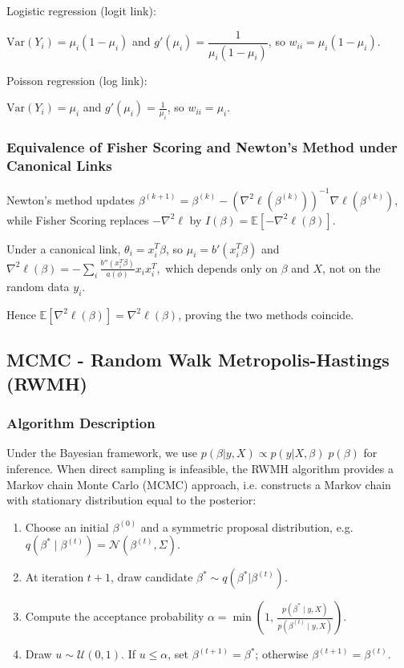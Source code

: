\documentclass[11pt]{article}
\newcommand{\derivstep}[1]{%
  \par\medskip\noindent #1%
}
\begin{document}
\derivstep{Logistic regression (logit link): }
$\mathrm{Var}(Y_i)=\mu_i(1-\mu_i)$ and
$g'(\mu_i)=\dfrac{1}{\mu_i(1-\mu_i)}$, so
$w_{ii}=\mu_i(1-\mu_i)$.

\derivstep{Poisson regression (log link): }
$\mathrm{Var}(Y_i)=\mu_i$ and $g'(\mu_i)=\frac1{\mu_i}$, so 
$w_{ii}=\mu_i$.

\subsubsection{Equivalence of Fisher Scoring and Newton's Method under Canonical Links}\vspace{-2pt}
Newton's method updates $\beta^{(k+1)} = \beta^{(k)} - (\nabla^2\ell(\beta^{(k)}))^{-1}\nabla\ell(\beta^{(k)})$, while Fisher Scoring replaces $-\nabla^2\ell$ by $I(\beta) = \mathbb{E}[-\nabla^2\ell(\beta)]$. 

\derivstep{Under a canonical link, }$\theta_i = x_i^T\beta$, so $\mu_i = b'(x_i^T\beta)$ and
$\nabla^2\ell(\beta) = -\sum_i \frac{b''(x_i^T\beta)}{a(\phi)} x_i x_i^T,$
which depends only on $\beta$ and $X$, not on the random data $y_i$. 

\derivstep{Hence } $\mathbb{E}[\nabla^2\ell(\beta)] = \nabla^2\ell(\beta)$, proving the two methods coincide.

\subsection{MCMC - Random Walk Metropolis-Hastings (RWMH)}
\subsubsection{Algorithm Description}\vspace{-2pt}
Under the Bayesian framework, we use $p(\beta | y, X) \propto p(y | X, \beta) \;p(\beta)$ for inference. When direct sampling is infeasible, the RWMH algorithm provides a Markov chain Monte Carlo (MCMC) approach, i.e. constructs a Markov chain with stationary distribution equal to the posterior:
\begin{enumerate}[itemsep=1pt, topsep=4pt]
    \item Choose an initial
    $\beta^{(0)}$ and a symmetric proposal distribution, e.g. 
    $
    q\!\left(\beta^\ast \mid \beta^{(t)}\right)
    = \mathcal{N}\!\left(\beta^{(t)}, \Sigma\right).
    $
    \item At iteration $t+1$, draw candidate $\beta^* \sim q(\beta^* | \beta^{(t)})$.
    \item Compute the acceptance
    probability $\alpha = \min\!\left(1,\,\frac{p(\beta^\ast \mid y, X)}{p(\beta^{(t)} \mid y, X)}\right)$.
    \item Draw $u \sim \mathcal{U}(0,1)$. If $u \leq \alpha$, set $\beta^{(t+1)} = \beta^*$; otherwise $\beta^{(t+1)} = \beta^{(t)}$.
\end{enumerate}
\end{document}
